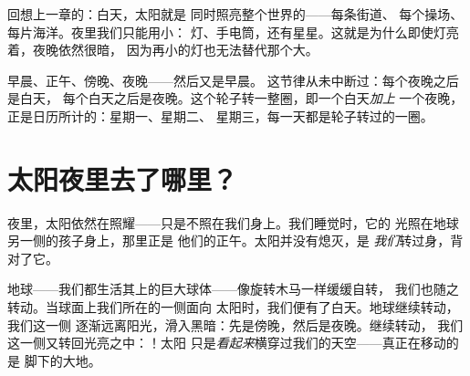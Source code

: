 \begin{remark}[白天的大光源]\label{rem:g1:day-and-night:lamp}
回想上一章的：白天，太阳就是
同时照亮整个世界的——每条街道、
每个操场、每片海洋。夜里我们只能用小：
灯、手电筒，还有星星。这就是为什么即使灯亮着，夜晚依然很暗，
因为再小的灯也无法替代那个大。
\end{remark}

\begin{example}[节律在重复]\label{ex:g1:day-and-night:rhythm}
早晨、正午、傍晚、夜晚——然后又是早晨。
这节律从未中断过：每个夜晚之后是白天，
每个白天之后是夜晚。这个轮子转一整圈，即一个白天\emph{加上}
一个夜晚，正是日历所计的：星期一、星期二、
星期三，每一天都是轮子转过的一圈。
\end{example}

\section{太阳夜里去了哪里？}

夜里，太阳依然在照耀——只是不照在我们身上。我们睡觉时，它的
光照在地球另一侧的孩子身上，那里正是
他们的正午。太阳并没有熄灭，是
\emph{我们}转过身，背对了它。

\begin{example}[旋转的地球]\label{ex:g1:day-and-night:spinning}
地球——我们都生活其上的巨大球体——像旋转木马一样缓缓自转，
我们也随之转动。当球面上我们所在的一侧面向
太阳时，我们便有了白天。地球继续转动，我们这一侧
逐渐远离阳光，滑入黑暗：先是傍晚，然后是夜晚。继续转动，
我们这一侧又转回光亮之中：！太阳
只是\emph{看起来}横穿过我们的天空——真正在移动的是
脚下的大地。
\end{example}

